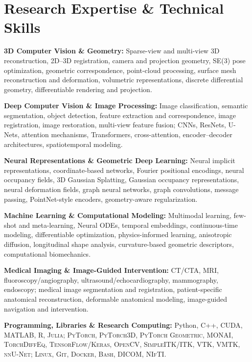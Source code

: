 \documentclass[letterpaper,10pt]{article}
\begin{document}
\section{Research Expertise \& Technical Skills}
{\normalsize

\textbf{3D Computer Vision \& Geometry:}
Sparse-view and multi-view 3D reconstruction, 2D--3D registration,
camera and projection geometry, SE(3) pose optimization,
geometric correspondence, point-cloud processing,
surface mesh reconstruction and deformation,
volumetric representations, discrete differential geometry,
differentiable rendering and projection.\par\vspace{2pt}

\textbf{Deep Computer Vision \& Image Processing:}
Image classification, semantic segmentation, object detection,
feature extraction and correspondence, image registration,
image restoration, multi-view feature fusion;
CNNs, ResNets, U-Nets, attention mechanisms,
Transformers, cross-attention, encoder--decoder architectures,
spatiotemporal modeling.\par\vspace{2pt}

\textbf{Neural Representations \& Geometric Deep Learning:}
Neural implicit representations, coordinate-based networks,
Fourier positional encodings, neural occupancy fields,
3D Gaussian Splatting, Gaussian occupancy representations,
neural deformation fields, graph neural networks,
graph convolutions, message passing, PointNet-style encoders,
geometry-aware regularization.\par\vspace{2pt}

\textbf{Machine Learning \& Computational Modeling:}
Multimodal learning, few-shot and meta-learning,
Neural ODEs, temporal embeddings, continuous-time modeling,
differentiable optimization, physics-informed learning,
anisotropic diffusion, longitudinal shape analysis,
curvature-based geometric descriptors,
computational biomechanics.\par\vspace{2pt}

\textbf{Medical Imaging \& Image-Guided Intervention:}
CT/CTA, MRI, fluoroscopy/angiography,
ultrasound/echocardiography, mammography, endoscopy;
medical image segmentation and registration,
patient-specific anatomical reconstruction,
deformable anatomical modeling,
image-guided navigation and intervention.\par\vspace{2pt}

\textbf{Programming, Libraries \& Research Computing:}
Python, \textsc{C++, CUDA, MATLAB, R, Julia;
PyTorch, PyTorch3D, PyTorch Geometric, MONAI,
TorchDiffEq, TensorFlow/Keras, OpenCV,
SimpleITK/ITK, VTK, VMTK, nnU-Net;
Linux, Git, Docker, Bash, DICOM, NIfTI.}\par

}
\end{document}
